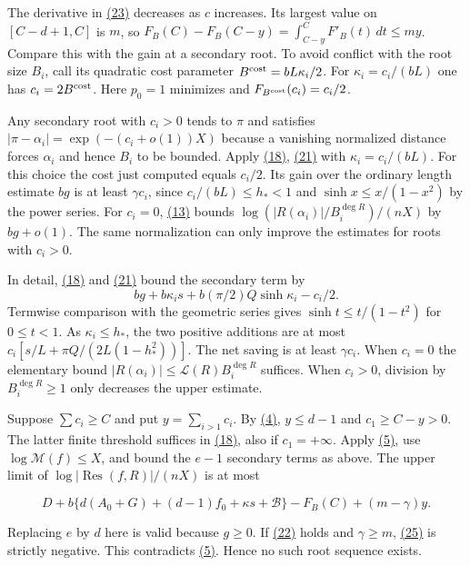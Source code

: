 \documentclass[11pt,a4paper]{article}
\begin{document}
The derivative in \hyperref[eq:23]{(23)} decreases as \(c\) increases. Its largest value on \([C-d+1,C]\) is \(m\), so \(F_B(C)-F_B(C-y)=\int_{C-y}^C F'_B(t)\,dt\le my\). Compare this with the gain at a secondary root. To avoid conflict with the root size \(B_i\), call its quadratic cost parameter \(B^{\rm cost}=bL\kappa_i/2\). For \(\kappa_i=c_i/(bL)\) one has \(c_i=2B^{\rm cost}\). Here \(p_0=1\) minimizes and \(F_{B^{\rm cost}}(c_i)=c_i/2\).

Any secondary root with \(c_i>0\) tends to \(\pi\) and satisfies \(|\pi-\alpha_i|=\exp(-(c_i+o(1))X)\) because a vanishing normalized distance forces \(\alpha_i\) and hence \(B_i\) to be bounded. Apply \hyperref[eq:18]{(18)}, \hyperref[eq:21]{(21)} with \(\kappa_i=c_i/(bL)\). For this choice the cost just computed equals \(c_i/2\). Its gain over the ordinary length estimate \(bg\) is at least \(\gamma c_i\), since \(c_i/(bL)\le h_*<1\) and \(\sinh x\le x/(1-x^2)\) by the power series. For \(c_i=0\), \hyperref[eq:13]{(13)} bounds \(\log(|R(\alpha_i)|/B_i^{\deg R})/(nX)\) by \(bg+o(1)\). The same normalization can only improve the estimates for roots with \(c_i>0\).

In detail, \hyperref[eq:18]{(18)} and \hyperref[eq:21]{(21)} bound the secondary term by \[
 bg+b\kappa_i s+b(\pi/2)Q\sinh\kappa_i-c_i/2 .
\] Termwise comparison with the geometric series gives \(\sinh t\le t/(1-t^2)\) for \(0\le t<1\). As \(\kappa_i\le h_*\), the two positive additions are at most \(c_i[s/L+\pi Q/(2L(1-h_*^2))]\). The net saving is at least \(\gamma c_i\). When \(c_i=0\) the elementary bound \(|R(\alpha_i)|\le\mathcal L(R)B_i^{\deg R}\) suffices. When \(c_i>0\), division by \(B_i^{\deg R}\ge1\) only decreases the upper estimate.

Suppose \(\sum c_i\ge C\) and put \(y=\sum_{i>1}c_i\). By \hyperref[eq:4]{(4)}, \(y\le d-1\) and \(c_1\ge C-y>0\). The latter finite threshold suffices in \hyperref[eq:18]{(18)}, also if \(c_1=+\infty\). Apply \hyperref[eq:5]{(5)}, use \(\log\mathcal M(f)\le X\), and bound the \(e-1\) secondary terms as above. The upper limit of \(\log|\operatorname{Res}(f,R)|/(nX)\) is at most

\[
 D+b\{d(A_0+G)+(d-1)f_0+\kappa s+\mathcal B\}
       -F_B(C)+(m-\gamma)y .                                              \tag{25}\label{eq:25}
\]

Replacing \(e\) by \(d\) here is valid because \(g\ge0\). If \hyperref[eq:22]{(22)} holds and \(\gamma\ge m\), \hyperref[eq:25]{(25)} is strictly negative. This contradicts \hyperref[eq:5]{(5)}. Hence no such root sequence exists.
\end{document}
